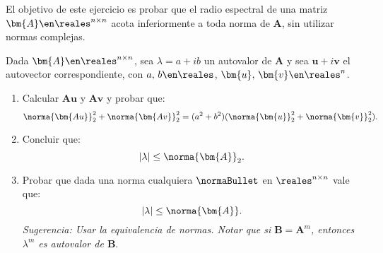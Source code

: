 \begin{enunciado}{\ejercicio}
  El objetivo de este ejercicio es probar que el radio espectral de una matriz $\bm{A} \en \reales^{n \times n}$ acota
  inferiormente a toda norma de $\bm{A}$, sin utilizar normas complejas.

  Dada $\bm{A} \en \reales^{n \times n}$, sea $\lambda = a + ib$ un autovalor de $\bm{A}$ y sea $\bm{u} + i \bm{v}$ el autovector correspondiente,
  con $a,\, b \en \reales$, $\bm{u},\, \bm{v} \en \reales^{n}$.

  \begin{enumerate}[label=\alph*)]
    \item Calcular $\bm{Au}$ y $\bm{Av}$ y probar que:
          $$
            \norma{\bm{Au}}_2^2 +
            \norma{\bm{Av}}_2^2 =
            (a^2 + b^2)(\norma{\bm{u}}_2^2 + \norma{\bm{v}}_2^2).
          $$

    \item Concluir que:
          $$
            |\lambda| \leq \norma{\bm{A}}_2.
          $$

    \item Probar que dada una norma cualquiera $\normaBullet$ en $\reales^{n \times n}$ vale que:
          $$
            |\lambda| \leq \norma{\bm{A}}.
          $$
          \textit{Sugerencia: Usar la equivalencia de normas. Notar que si $\bm{B} = \bm{A}^m$, entonces $\lambda^m$
            es autovalor de $\bm{B}$}.
  \end{enumerate}
\end{enunciado}

